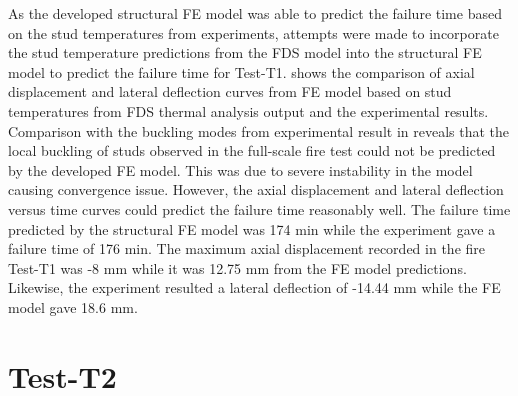 As the developed structural FE model was able to predict the failure time based on the stud temperatures from experiments, attempts were made to incorporate the stud temperature predictions from the FDS model into the structural FE model to predict the failure time for Test-T1.  shows the comparison of axial displacement and lateral deflection curves from FE model based on stud temperatures from FDS thermal analysis output and the experimental results. Comparison with the buckling modes from experimental result in  reveals that the local buckling of studs observed in the full-scale fire test could not be predicted by the developed FE model. This was due to severe instability in the model causing convergence issue. However, the axial displacement and lateral deflection versus time curves could predict the failure time reasonably well. The failure time predicted by the structural FE model was 174 min while the experiment gave a failure time of 176 min. The maximum axial displacement recorded in the fire Test-T1 was -8 mm while it was 12.75 mm from the FE model predictions. Likewise, the experiment resulted a lateral deflection of -14.44 mm while the FE model gave 18.6 mm.   

\section*{Test-T2}

